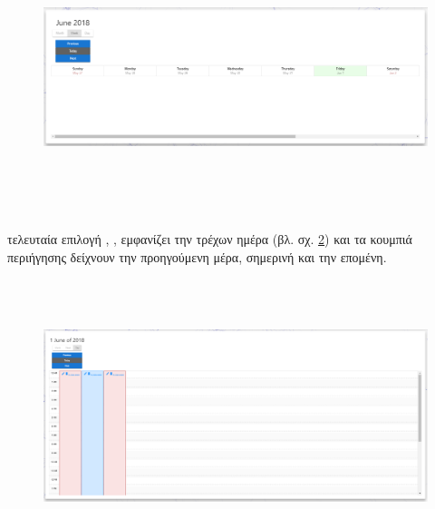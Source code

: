 \begin{figure}[!htb]
\includegraphics[width=\columnwidth, height=8cm]{images/userCalendarWeek.png}
\caption{}
\label{fig:userCalendarWeek}
\end{figure}

 τελευταία επιλογή , , εμφανίζει την τρέχων ημέρα (βλ. σχ. \ref{fig:userCalendarDay}) και τα κουμπιά περιήγησης δείχνουν την προηγούμενη μέρα, σημερινή και την επομένη.

\begin{figure}[!htb]
\includegraphics[width=\columnwidth, height=8cm]{images/userCalendarDay.png}
\caption{}
\label{fig:userCalendarDay}
\end{figure}

\pagebreak

